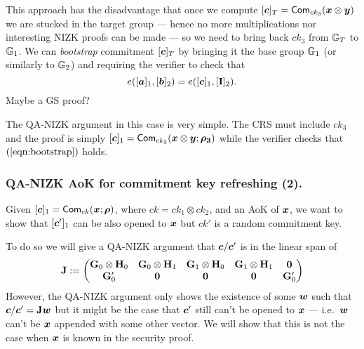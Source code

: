 This approach has the disadvantage that once we compute $[{\boldsymbol{c}}]_T=\allowbreak\mathsf{Com}_{ck_3}({\boldsymbol{x}}\otimes{\boldsymbol{y}})$ we are stucked in the target group --- hence no more multiplications nor interesting NIZK proofs can be made --- so we need to bring back $ck_3$ from $\mathbb{G}_T$ to $\mathbb{G}_1$. We can \emph{bootstrap} commitment $[{\boldsymbol{c}}]_T$  by bringing it the base group $\mathbb{G}_1$ (or similarly to $\mathbb{G}_2$) and requiring the verifier to check that
\begin{equation}
e([{\boldsymbol{a}}]_1,[{\boldsymbol{b}}]_2)=e([{\boldsymbol{c}}]_1,[\mathbf{{I}}]_{2}).\label{eqn:bootstrap}
\end{equation}
{\color{red} Maybe a GS proof? }

The QA-NIZK argument in this case is very simple. The CRS must include $ck_3$ and the proof is simply $[{\boldsymbol{c}}]_1=\mathsf{Com}_{ck_3}({\boldsymbol{x}}\otimes{\boldsymbol{y}};{\boldsymbol{\rho_3}})$ while the verifier checks that $(\ref{eqn:bootstrap})$ holds.
%
%

\subsubsection{QA-NIZK AoK for commitment key refreshing (2).}
Given $[{\boldsymbol{c}}]_1=\allowbreak\mathsf{Com}_{ck}({\boldsymbol{x}};\allowbreak {\boldsymbol{\rho}})$, where $ck = ck_1\otimes ck_2$, and an AoK of ${\boldsymbol{x}}$, we want to show that $[{\boldsymbol{c}}']_1$ can be also opened to ${\boldsymbol{x}}$ but $ck'$ is a random commitment key.

To do so we will give a QA-NIZK argument that ${\boldsymbol{c}}/{\boldsymbol{c}}'$ is in the linear span of
$$
\mathbf{{J}}:=
\begin{pmatrix}
\mathbf{{G}}_0\otimes\mathbf{{H}}_0 & \mathbf{{G}}_0\otimes\mathbf{{H}}_1 & \mathbf{{G}}_1\otimes\mathbf{{H}}_0& \mathbf{{G}}_1\otimes\mathbf{{H}}_1 & \mathbf{{0}}\\
\mathbf{{G}}'_0 & \mathbf{{0}} & \mathbf{{0}} & \mathbf{{0}} & \mathbf{{G}}'_0 
\end{pmatrix}
$$
However, the QA-NIZK argument only shows the existence of some ${\boldsymbol{w}}$ such that ${\boldsymbol{c}}/{\boldsymbol{c}}' = \mathbf{{J}}{\boldsymbol{w}}$ but it might be the case that ${\boldsymbol{c}}'$ still can't be opened to ${\boldsymbol{x}}$ --- i.e.~${\boldsymbol{w}}$ can't be ${\boldsymbol{x}}$ appended with some other vector. We will show that this is not the case when ${\boldsymbol{x}}$ is known in the security proof.

